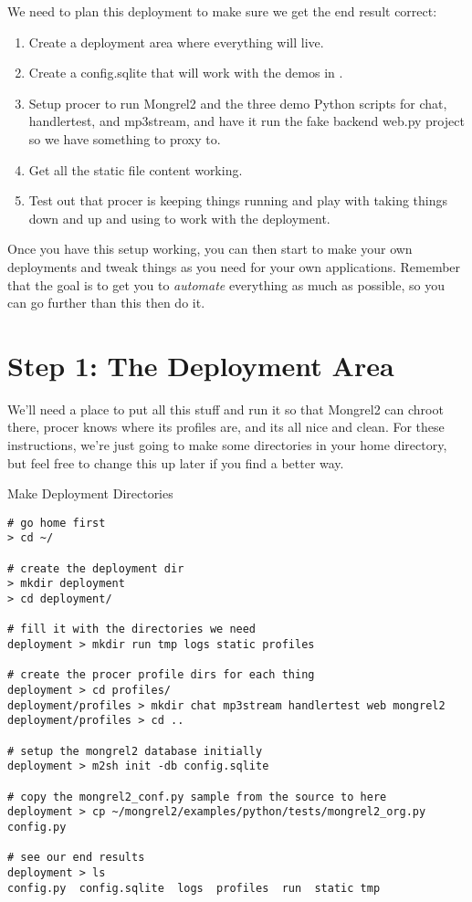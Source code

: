 We need to plan this deployment to make sure we get the end result correct:

\begin{enumerate}
\item Create a deployment area where everything will live.
\item Create a config.sqlite that will work with the demos in .
\item Setup procer to run Mongrel2 and the three demo Python scripts for chat, handlertest, and mp3stream,
    and have it run the fake backend web.py project so we have something to proxy to.
\item Get all the static file content working.
\item Test out that procer is keeping things running and play with taking things down and up and using
     to work with the deployment.
\end{enumerate}

Once you have this setup working, you can then start to make your own
deployments and tweak things as you need for your own applications.  Remember
that the goal is to get you to \emph{automate} everything as much as possible,
so you can go further than this then do it.

\section{Step 1: The Deployment Area}

We'll need a place to put all this stuff and run it so that Mongrel2 can chroot
there, procer knows where its profiles are, and its all nice and clean.  For these
instructions, we're just going to make some directories in your home directory,
but feel free to change this up later if you find a better way.

\begin{code}{Make Deployment Directories}
\begin{Verbatim}
# go home first
> cd ~/

# create the deployment dir
> mkdir deployment
> cd deployment/

# fill it with the directories we need
deployment > mkdir run tmp logs static profiles

# create the procer profile dirs for each thing
deployment > cd profiles/
deployment/profiles > mkdir chat mp3stream handlertest web mongrel2
deployment/profiles > cd ..

# setup the mongrel2 database initially
deployment > m2sh init -db config.sqlite

# copy the mongrel2_conf.py sample from the source to here
deployment > cp ~/mongrel2/examples/python/tests/mongrel2_org.py config.py

# see our end results
deployment > ls
config.py  config.sqlite  logs  profiles  run  static tmp

\end{Verbatim}
\end{code}

